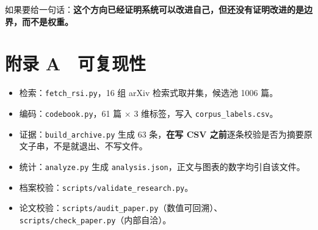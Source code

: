 如果要给一句话：\textbf{这个方向已经证明系统可以改进自己，但还没有证明改进的是边界，而不是权重。}


\section{附录 A　可复现性}

\begin{itemize}
  \item 检索：\texttt{fetch\_rsi.py}，16 组 arXiv 检索式取并集，候选池 1006 篇。
  \item 编码：\texttt{codebook.py}，61 篇 × 3 维标签，写入 \texttt{corpus\_labels.csv}。
  \item 证据：\texttt{build\_archive.py} 生成 63 条，\textbf{在写 CSV 之前}逐条校验是否为摘要原文子串，不是就退出、不写文件。
  \item 统计：\texttt{analyze.py} 生成 \texttt{analysis.json}，正文与图表的数字均引自该文件。
  \item 档案校验：\texttt{scripts/validate\_research.py}。
  \item 论文校验：\texttt{scripts/audit\_paper.py}（数值可回溯）、\texttt{scripts/check\_paper.py}（内部自洽）。
\end{itemize}